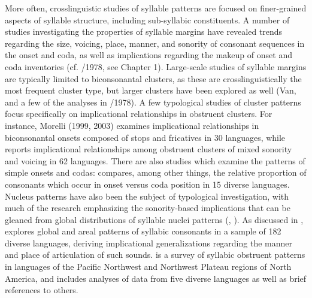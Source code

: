   More often, crosslinguistic studies of syllable patterns are focused on finer-grained aspects of syllable structure, including sub-syllabic constituents. A number of studies investigating the properties of syllable margins have revealed trends regarding the size, voicing, place, manner, and sonority of consonant sequences in the onset and coda, as well as implications regarding the makeup of onset and coda inventories (cf. \citealt{Greenberg1965}/1978, see Chapter 1). Large-scale studies of syllable margins are typically limited to biconsonantal clusters, as these are crosslinguistically the most frequent cluster type, but larger clusters have been explored as well (Van\citealt{Dam2004}, and a few of the analyses in \citealt{Greenberg1965}/1978). A few typological studies of cluster patterns focus specifically on implicational relationships in obstruent clusters. For instance, Morelli (1999, 2003) examines implicational relationships in biconsonantal onsets composed of stops and fricatives in 30 languages, while \citet{Kreitman2008} reports implicational relationships among obstruent clusters of mixed sonority and voicing in 62 languages. There are also studies which examine the patterns of simple onsets and codas: \citet{Rousset2004} compares, among other things, the relative proportion of consonants which occur in onset versus coda position in 15 diverse languages. Nucleus patterns have also been the subject of typological investigation, with much of the research emphasizing the sonority-based implications that can be gleaned from global distributions of syllable nuclei patterns (\citealt{Blevins1995}, \citealt{Zec2007}). As discussed in , \citet{Bell1978a} explores global and areal patterns of syllabic consonants in a sample of 182 diverse languages, deriving implicational generalizations regarding the manner and place of articulation of such sounds. \citet{Hoard1978} is a survey of syllabic obstruent patterns in languages of the Pacific Northwest and Northwest Plateau regions of North America, and includes analyses of data from five diverse languages as well as brief references to others.

